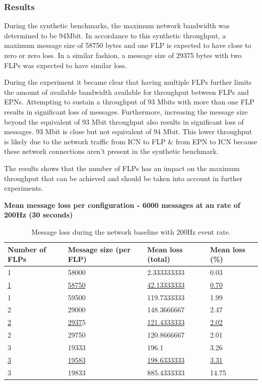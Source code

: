 \documentclass[]{article}
\begin{document}
\subsubsection{Results}
During the synthetic benchmarks, the maximum network bandwidth was determined to be 94Mbit. In accordance to this synthetic throughput, a maximum message size of 58750 bytes and one FLP is expected to have close to zero or zero loss. In a similar fashion, a message size of 29375 bytes with two FLPs was expected to have similar loss. 

During the experiment it became clear that having multiple FLPs further limits the amount of available bandwidth available for throughput between FLPs and EPNs. Attempting to sustain a throughput of 93 Mbits with more than one FLP results in significant loss of messages. Furthermore, increasing the message size beyond the equivalent of 93 Mbit throughput also results in significant loss of messages. 93 Mbit is close but not equivalent of 94 Mbit. This lower throughput is likely due to the network traffic from ICN to FLP \& from EPN to ICN because these network connections aren’t present in the synthetic benchmark.

The results shows that the number of FLPs has an impact on the maximum throughput that can be achieved and should be taken into account in further experiments. 

\begin{table}[H]
	\textbf{Mean message loss per configuration - 6000 messages at an rate of 200Hz (30 seconds)}
	\begin{center}
		\begin{tabularx}{\textwidth}{ | X | X | X | X | }
			\hline
			\textbf{Number of FLPs} & \textbf{Message size (per FLP)} & \textbf{Mean loss (total)} & \textbf{Mean loss (\%)} \\ \hline
			
			1 & 58000 & 2.333333333 & 0.03 \\ \hline
			\underline{1} & \underline{58750} & \underline{42.13333333} & \underline{0.70} \\ \hline
			1 & 59500 & 119.7333333 & 1.99 \\ \hline
			
			2 & 29000 & 148.3666667 & 2.47 \\ \hline
			\underline{2} & \underline{2937}5 & \underline{121.4333333} & \underline{2.02} \\ \hline
			2 & 29750 & 120.8666667 & 2.01 \\ \hline
			
			3 & 19333 & 196.1 & 3.26 \\ \hline
			\underline{3} & \underline{19583} & \underline{198.6333333} & \underline{3.31} \\ \hline
			3 & 19833 & 885.4333333 & 14.75 \\ \hline
		\end{tabularx}
		\caption{Message loss during the network baseline with 200Hz event rate.}
		\label{tab:resultsbaseline}
	\end{center}
\end{table}
\end{document}
